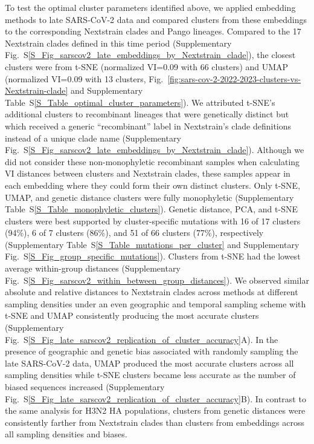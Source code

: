 \documentclass[webpdf,contemporary,large,single]{oup-authoring-template}%
\theoremstyle{thmstyleone}%
\theoremstyle{thmstyletwo}%
\theoremstyle{thmstylethree}%
\begin{document}
To test the optimal cluster parameters identified above, we applied embedding methods to late SARS-CoV-2 data and compared clusters from these embeddings to the corresponding Nextstrain clades and Pango lineages.
Compared to the 17 Nextstrain clades defined in this time period (Supplementary Fig.~S\ref{S_Fig_sarscov2_late_embeddings_by_Nextstrain_clade}), the closest clusters were from t-SNE (normalized VI=0.09 with 66 clusters) and UMAP (normalized VI=0.09 with 13 clusters, Fig.~\ref{fig:sars-cov-2-2022-2023-clusters-vs-Nextstrain-clade} and Supplementary Table~S\ref{S_Table_optimal_cluster_parameters}).
We attributed t-SNE's additional clusters to recombinant lineages that were genetically distinct but which received a generic ``recombinant'' label in Nextstrain's clade definitions instead of a unique clade name (Supplementary Fig.~S\ref{S_Fig_sarscov2_late_embeddings_by_Nextstrain_clade}).
Although we did not consider these non-monophyletic recombinant samples when calculating VI distances between clusters and Nextstrain clades, these samples appear in each embedding where they could form their own distinct clusters.
Only t-SNE, UMAP, and genetic distance clusters were fully monophyletic (Supplementary Table~S\ref{S_Table_monophyletic_clusters}).
Genetic distance, PCA, and t-SNE clusters were best supported by cluster-specific mutations with 16 of 17 clusters (94\%), 6 of 7 clusters (86\%), and 51 of 66 clusters (77\%), respectively (Supplementary Table~S\ref{S_Table_mutations_per_cluster} and Supplementary Fig.~S\ref{S_Fig_group_specific_mutations}).
Clusters from t-SNE had the lowest average within-group distances (Supplementary Fig.~S\ref{S_Fig_sarscov2_within_between_group_distances}).
We observed similar absolute and relative distances to Nextstrain clades across methods at different sampling densities under an even geographic and temporal sampling scheme with t-SNE and UMAP consistently producing the most accurate clusters (Supplementary Fig.~S\ref{S_Fig_late_sarscov2_replication_of_cluster_accuracy}A).
In the presence of geographic and genetic bias associated with randomly sampling the late SARS-CoV-2 data, UMAP produced the most accurate clusters across all sampling densities while t-SNE clusters became less accurate as the number of biased sequences increased (Supplementary Fig.~S\ref{S_Fig_late_sarscov2_replication_of_cluster_accuracy}B).
In contrast to the same analysis for H3N2 HA populations, clusters from genetic distances were consistently farther from Nextstrain clades than clusters from embeddings across all sampling densities and biases.
\end{document}
